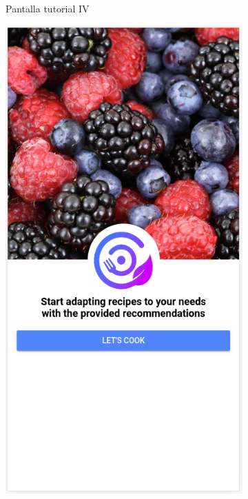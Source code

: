 \begin{figure}[H]
\begin{subfigure}[b]{0.32\linewidth}
        \caption{Pantalla tutorial IV}
        \label{fig:app_tutorial4}
    \end{subfigure}
    \begin{subfigure}[b]{0.32\linewidth}
        \includegraphics[width=\linewidth]{imagenes/app/pantallas/app_welcome.png}

\end{subfigure}
\end{figure}
